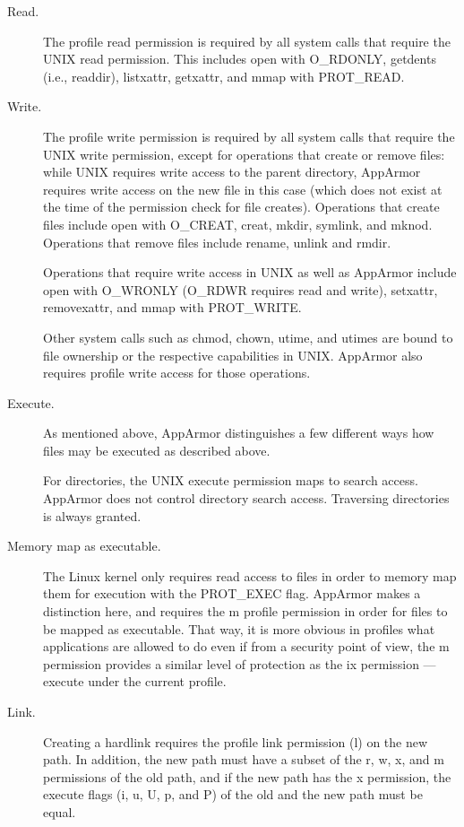 \documentclass[a4paper]{article}
\begin{document}
\begin{description}

\item[Read.]
The profile read permission is required by all system calls that
require the UNIX read permission. This includes open with
O\_RDONLY, getdents (i.e., readdir), listxattr, getxattr, and
mmap with PROT\_READ.

\item[Write.]
The profile write permission is required by all system calls
that require the UNIX write permission, except for operations
that create or remove files: while UNIX requires write access to
the parent directory, AppArmor requires write access on the new
file in this case (which does not exist at the time of the
permission check for file creates).  Operations that create
files include open with O\_CREAT, creat, mkdir, symlink, and
mknod.  Operations that remove files include rename, unlink and
rmdir.

Operations that require write access in UNIX as well as AppArmor
include open with O\_WRONLY (O\_RDWR requires read and write),
setxattr, removexattr, and mmap with PROT\_WRITE.

Other system calls such as chmod, chown, utime, and utimes are
bound to file ownership or the respective capabilities in UNIX.
AppArmor also requires profile write access for those operations.

\item[Execute.]
As mentioned above, AppArmor distinguishes a few different ways
how files may be executed as described above.

For directories, the UNIX execute permission maps to search
access.  AppArmor does not control directory search access.
Traversing directories is always granted.

\item[Memory map as executable.]
The Linux kernel only requires read access to files in order
to memory map them for execution with the PROT\_EXEC flag.
AppArmor makes a distinction here, and requires the m profile
permission in order for files to be mapped as executable.  That way,
it is more obvious in profiles what applications are allowed to do even
if from a security point of view, the m permission provides a similar
level of protection as the ix permission --- execute under the current
profile.

\item[Link.]
Creating a hardlink requires the profile link permission (l) on the new
path.  In addition, the new path must have a subset of the r, w, x, and
m permissions of the old path, and if the new path has the x permission,
the execute flags (i, u, U, p, and P) of the old and the new path must
be equal.


\end{description}
\end{document}

